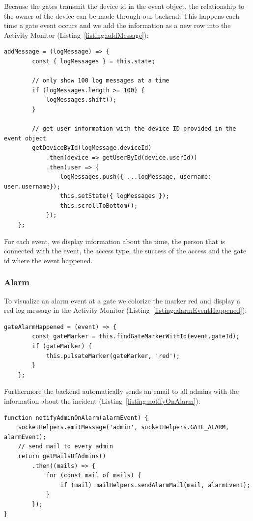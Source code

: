 Because the gates transmit the device id in the event object, the relationship to the owner of the device can be made through our backend. This happens each time a gate event occurs and we add the information as a new row into the Activity Monitor (Listing~\ref{listing:addMessage}):

\begin{lstlisting}[label={listing:addMessage},caption={Function for adding message to Activity Monitor}]
addMessage = (logMessage) => {
        const { logMessages } = this.state;
        
        // only show 100 log messages at a time
        if (logMessages.length >= 100) {
            logMessages.shift();
        }

        // get user information with the device ID provided in the event object
        getDeviceById(logMessage.deviceId)
            .then(device => getUserById(device.userId))
            .then(user => {
                logMessages.push({ ...logMessage, username: user.username});
                this.setState({ logMessages });
                this.scrollToBottom();
            });
    };
\end{lstlisting}

For each event, we display information about the time, the person that is connected with the event, the access type, the success of the access and the gate id where the event happened.

\subsubsection{Alarm}

To visualize an alarm event at a gate we colorize the marker red and display a red log message in the Activity Monitor (Listing~\ref{listing:alarmEventHappened}):

\begin{lstlisting}[label={listing:alarmEventHappened},caption={Handling gate alarm events in frontend}]
gateAlarmHappened = (event) => {
        const gateMarker = this.findGateMarkerWithId(event.gateId);
        if (gateMarker) {
            this.pulsateMarker(gateMarker, 'red');
        }
    };
\end{lstlisting}

Furthermore the backend automatically sends an email to all admins with the information about the incident (Listing~\ref{listing:notifyOnAlarm}):

\begin{lstlisting}[label={listing:notifyOnAlarm},caption={Notifying admins on alarm event}]
function notifyAdminOnAlarm(alarmEvent) {
    socketHelpers.emitMessage('admin', socketHelpers.GATE_ALARM, alarmEvent);
    // send mail to every admin
    return getMailsOfAdmins()
        .then((mails) => {
            for (const mail of mails) {
                if (mail) mailHelpers.sendAlarmMail(mail, alarmEvent);
            }
        });
}
\end{lstlisting}

\clearpage
